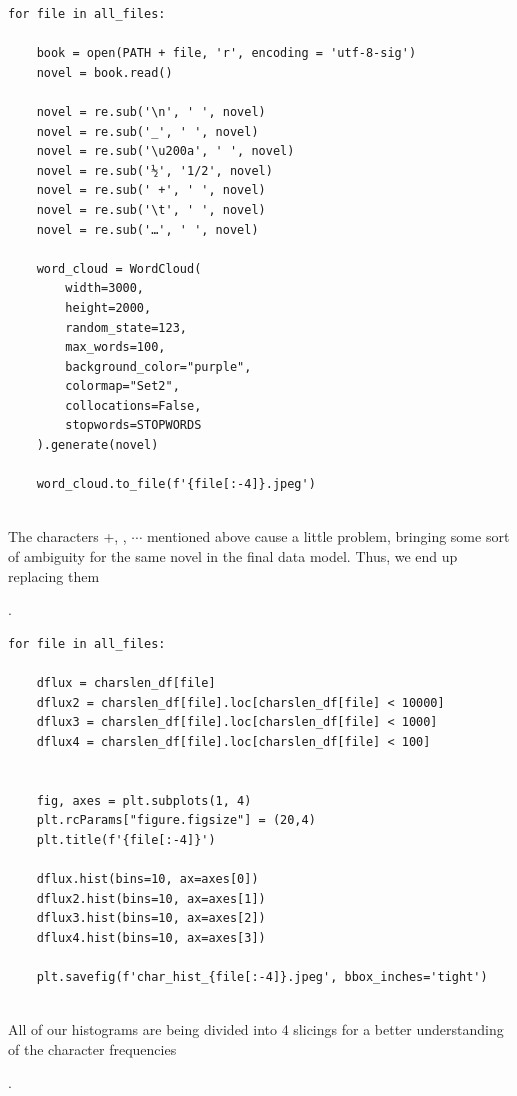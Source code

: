 \begin{code}
\label{code:word-cloud}
\begin{verbatim}
for file in all_files:
            
    book = open(PATH + file, 'r', encoding = 'utf-8-sig')
    novel = book.read()
    
    novel = re.sub('\n', ' ', novel)
    novel = re.sub('_', ' ', novel)
    novel = re.sub('\u200a', ' ', novel)
    novel = re.sub('½', '1/2', novel)
    novel = re.sub(' +', ' ', novel)
    novel = re.sub('\t', ' ', novel)
    novel = re.sub('…', ' ', novel)
    
    word_cloud = WordCloud(
        width=3000,
        height=2000,
        random_state=123,
        max_words=100,
        background_color="purple",
        colormap="Set2",
        collocations=False,
        stopwords=STOPWORDS
    ).generate(novel)
    
    word_cloud.to_file(f'{file[:-4]}.jpeg')
    
\end{verbatim}
\caption{The characters +, \textunderscore, $\cdots$ mentioned above cause a little problem, bringing some sort of ambiguity for the same novel in the final data model. Thus, we end up replacing them}.
\end{code}

\begin{code}
\label{code:histograms}
\begin{verbatim}
for file in all_files:
    
    dflux = charslen_df[file]
    dflux2 = charslen_df[file].loc[charslen_df[file] < 10000]
    dflux3 = charslen_df[file].loc[charslen_df[file] < 1000]
    dflux4 = charslen_df[file].loc[charslen_df[file] < 100]


    fig, axes = plt.subplots(1, 4)
    plt.rcParams["figure.figsize"] = (20,4)
    plt.title(f'{file[:-4]}')

    dflux.hist(bins=10, ax=axes[0])
    dflux2.hist(bins=10, ax=axes[1])
    dflux3.hist(bins=10, ax=axes[2])
    dflux4.hist(bins=10, ax=axes[3])
    
    plt.savefig(f'char_hist_{file[:-4]}.jpeg', bbox_inches='tight')
    
\end{verbatim}
\caption{All of our histograms are being divided into 4 slicings for a better understanding of the character frequencies}.
\end{code}


